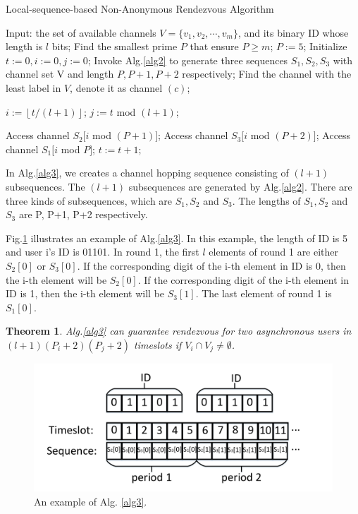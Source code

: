 \documentclass[10pt, conference, letterpaper]{IEEEtran}
\newtheorem{theorem}{Theorem}
\begin{document}
\begin{algorithm}
\caption{Local-sequence-based Non-Anonymous Rendezvous Algorithm}
\label{alg3}
\begin{algorithmic}[1]
\STATE Input: the set of available channels $V=\{v_1,v_2,\cdots,v_m\}$, and its binary ID whose length is $l$ bits;
\STATE Find the smallest prime $P$ that ensure $P \ge m$;
\STATE $P:= 5$;
\ENDIF
\STATE Initialize $t := 0, i:= 0, j:= 0$;
\STATE Invoke Alg.\ref{alg2} to generate three sequences $S_1,S_2,S_3$ with channel set V and length $P, P+1, P+2$ respectively;
\STATE Find the channel with the least label in $V$, denote it as channel $(c)$;

\STATE $i := \left \lfloor t / (l+1) \right \rfloor$;
\STATE $j := t $ mod $(l  +1)$;

   \STATE Access channel $S_2[i$ mod $(P+1)]$;
    \ELSE
    \STATE Access channel $S_3[i$ mod $ (P+2)]$;
    \ENDIF
\ELSE
\STATE Access channel $S_1[i $ mod $ P]$;
\ENDIF
\STATE $t := t + 1$;
\ENDWHILE

\end{algorithmic}
\end{algorithm}


In Alg.\ref{alg3}, we creates a channel hopping sequence consisting of $(l +1)$ subsequences. The $(l +1)$ subsequences are generated by Alg.\ref{alg2}. There are three kinds of subsequences, which are $S_1, S_2$ and $S_3$. The lengths of $S_1, S_2$ and $S_3$ are P, P+1, P+2 respectively.

Fig.\ref{exp-alg3} illustrates an example of Alg.\ref{alg3}. In this example, the length of ID is 5 and user i's ID is 01101. In round 1, the first $ l$ elements of round 1 are either $S_2[0]$ or $S_3[0]$. If the corresponding digit of the i-th element in ID is 0, then the i-th element will be $S_2[0]$. If the corresponding digit of the i-th element in ID is 1, then the i-th element will be $S_3[1]$. The last element of round 1 is $S_1[0]$.

\begin{theorem}
\label{theo-alg3}
Alg.\ref{alg3} can guarantee rendezvous for two asynchronous users in $(l  + 1)(P_i + 2)(P_j + 2)$ timeslots if $V_i \cap V_j \ne \emptyset$.
\end{theorem}

\begin{figure}[!t]
\centering
\includegraphics[width=1\columnwidth]{round}
\caption{An example of Alg. {\ref{alg3}}.}
\label{exp-alg3}
\end{figure}
\end{document}

